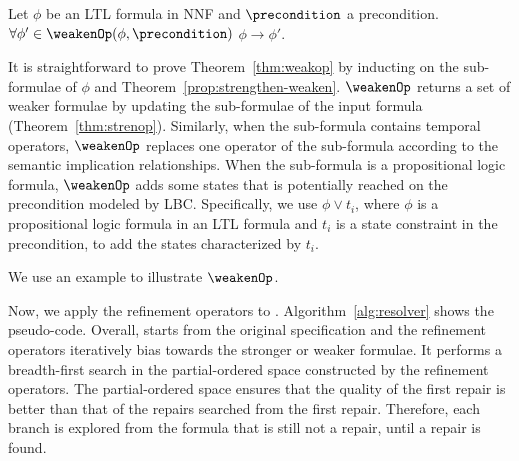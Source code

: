 \begin{theorem}\label{thm:weakop}
    Let $\phi$ be an LTL formula in NNF and $\precondition$ a precondition.
    $\forall \phi' \in \weakenOp(\phi,\precondition)$ \suchthat $\phi \to \phi'$.
\end{theorem}

It is straightforward to prove Theorem~\ref{thm:weakop} by inducting on the sub-formulae of $\phi$ and Theorem~\ref{prop:strengthen-weaken}.
$\weakenOp$ returns a set of weaker formulae by updating the sub-formulae of the input formula (Theorem~\ref{thm:strenop}).
Similarly, when the sub-formula contains temporal operators, $\weakenOp$ replaces one operator of the sub-formula according to the semantic implication relationships. 
When the sub-formula is a propositional logic formula, $\weakenOp$ adds some states that is potentially reached on the precondition modeled by LBC. 
Specifically, we use $\phi \lor t_i$, where $\phi$ is a propositional logic formula in an LTL formula and $t_i$ is a state constraint in the precondition, to add the states characterized by $t_i$. 

We use an example to illustrate $\weakenOp$.
\begin{example}

\end{example}

Now, we apply the refinement operators to \resolver.
Algorithm~\ref{alg:resolver} shows the pseudo-code.
Overall, \resolver starts from the original specification and the refinement operators iteratively bias \resolver towards the stronger or weaker formulae.
It performs a breadth-first search in the partial-ordered space constructed by the refinement operators.
The partial-ordered space ensures that the quality of the first repair is better than that of the repairs searched from the first repair.
Therefore, each branch is explored from the formula that is still not a repair, until a repair is found.

